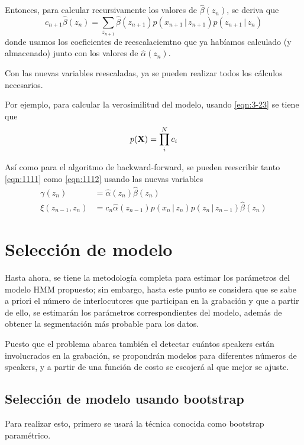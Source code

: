 Entonces, para calcular recursivamente los valores de $\hat \beta(z_n)$, se deriva que 
\begin{equation}
  c_{n+1} \hat \beta(z_n) = \sum_{z_{n+1}} \hat \beta(z_{n+1})
    p(x_{n+1} \,|\, z_{n+1}) p(z_{n+1} \,|\, z_n)    
  \label{eqn:3-28}
\end{equation}
donde usamos los coeficientes de reescalaciemtno que ya habíamos calculado (y almacenado) junto con los valores de $\hat \alpha(z_n)$.

Con las nuevas variables reescaladas, ya se pueden realizar todos los cálculos necesarios. 

Por ejemplo, para calcular la verosimilitud del modelo, usando \eqref{eqn:3-23} se tiene que
\begin{equation}
  p(\textbf{X}) =  \prod_i^N c_i
\end{equation}

Así como para el algoritmo de backward-forward, se pueden reescribir tanto     \eqref{eqn:1111} como \eqref{eqn:1112} usando las nuevas variables 
\begin{align}
  \gamma(z_n) &= \hat \alpha(z_n) \hat \beta(z_n) \\
  \xi(z_{n-1}, z_n) &= c_n \hat \alpha(z_{n-1}) p(x_n \,|\, z_n) 
      p(z_n \,|\, z_{n-1}) \hat \beta(z_n) 
\end{align}

\section{Selección de modelo}

Hasta ahora, se tiene la metodología completa para estimar los parámetros del modelo HMM propuesto; sin embargo, hasta este punto se considera que se sabe a priori el número de interlocutores que participan en la grabación y que a partir de ello, se estimarán los parámetros correspondientes del modelo, además de obtener la segmentación más probable para los datos.

Puesto que el problema abarca también el detectar cuántos speakers están involucrados en la grabación, se propondrán modelos para diferentes números de speakers, y a partir de una función de costo se escojerá al que mejor se ajuste.

\subsection{Selección de modelo usando bootstrap}

Para realizar esto, primero se usará la técnica conocida como bootstrap paramétrico.

